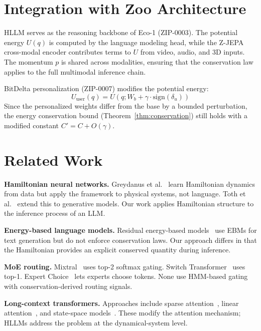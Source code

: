 \documentclass[11pt,letterpaper]{article}
\begin{document}
\section{Integration with Zoo Architecture}

HLLM serves as the reasoning backbone of Eco-1 (ZIP-0003). The potential energy $U(q)$ is computed by the language modeling head, while the Z-JEPA cross-modal encoder contributes terms to $U$ from video, audio, and 3D inputs. The momentum $p$ is shared across modalities, ensuring that the conservation law applies to the full multimodal inference chain.

BitDelta personalization (ZIP-0007) modifies the potential energy:
\begin{equation}
U_{\text{user}}(q) = U(q; W_b + \gamma \cdot \text{sign}(\delta_u))
\end{equation}
Since the personalized weights differ from the base by a bounded perturbation, the energy conservation bound (Theorem~\ref{thm:conservation}) still holds with a modified constant $C' = C + O(\gamma)$.

\section{Related Work}

\textbf{Hamiltonian neural networks.} Greydanus et al.~\cite{greydanus2019hamiltonian} learn Hamiltonian dynamics from data but apply the framework to physical systems, not language. Toth et al.~\cite{toth2020hamiltonian} extend this to generative models. Our work applies Hamiltonian structure to the inference process of an LLM.

\textbf{Energy-based language models.} Residual energy-based models~\cite{bakhtin2021residual} use EBMs for text generation but do not enforce conservation laws. Our approach differs in that the Hamiltonian provides an explicit conserved quantity during inference.

\textbf{MoE routing.} Mixtral~\cite{jiang2024mixtral} uses top-2 softmax gating. Switch Transformer~\cite{fedus2022switch} uses top-1. Expert Choice~\cite{zhou2022mixture} lets experts choose tokens. None use HMM-based gating with conservation-derived routing signals.

\textbf{Long-context transformers.} Approaches include sparse attention~\cite{child2019generating}, linear attention~\cite{katharopoulos2020transformers}, and state-space models~\cite{gu2024mamba}. These modify the attention mechanism; HLLMs address the problem at the dynamical-system level.
\end{document}
